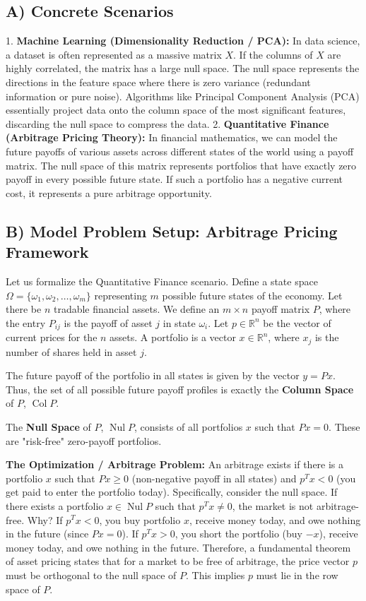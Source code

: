 \documentclass[11pt]{article}
\begin{document}
\subsection{A) Concrete Scenarios}
1. \textbf{Machine Learning (Dimensionality Reduction / PCA):} In data science, a dataset is often represented as a massive matrix $X$. If the columns of $X$ are highly correlated, the matrix has a large null space. The null space represents the directions in the feature space where there is zero variance (redundant information or pure noise). Algorithms like Principal Component Analysis (PCA) essentially project data onto the column space of the most significant features, discarding the null space to compress the data.
2. \textbf{Quantitative Finance (Arbitrage Pricing Theory):} In financial mathematics, we can model the future payoffs of various assets across different states of the world using a payoff matrix. The null space of this matrix represents portfolios that have exactly zero payoff in every possible future state. If such a portfolio has a negative current cost, it represents a pure arbitrage opportunity.

\subsection{B) Model Problem Setup: Arbitrage Pricing Framework}
Let us formalize the Quantitative Finance scenario. 
Define a state space $\Omega = \{\omega_1, \omega_2, \dots, \omega_m\}$ representing $m$ possible future states of the economy.
Let there be $n$ tradable financial assets. We define an $m \times n$ payoff matrix $P$, where the entry $P_{ij}$ is the payoff of asset $j$ in state $\omega_i$.
Let $p \in \mathbb{R}^n$ be the vector of current prices for the $n$ assets.
A portfolio is a vector $x \in \mathbb{R}^n$, where $x_j$ is the number of shares held in asset $j$.

The future payoff of the portfolio in all states is given by the vector $y = Px$. Thus, the set of all possible future payoff profiles is exactly the \textbf{Column Space} of $P$, $\operatorname{Col} P$.

The \textbf{Null Space} of $P$, $\operatorname{Nul} P$, consists of all portfolios $x$ such that $Px = 0$. These are "risk-free" zero-payoff portfolios. 

\textbf{The Optimization / Arbitrage Problem:}
An arbitrage exists if there is a portfolio $x$ such that $Px \ge 0$ (non-negative payoff in all states) and $p^T x < 0$ (you get paid to enter the portfolio today).
Specifically, consider the null space. If there exists a portfolio $x \in \operatorname{Nul} P$ such that $p^T x \neq 0$, the market is not arbitrage-free. 
Why? If $p^T x < 0$, you buy portfolio $x$, receive money today, and owe nothing in the future (since $Px = 0$). If $p^T x > 0$, you short the portfolio (buy $-x$), receive money today, and owe nothing in the future.
Therefore, a fundamental theorem of asset pricing states that for a market to be free of arbitrage, the price vector $p$ must be orthogonal to the null space of $P$. This implies $p$ must lie in the row space of $P$.
\end{document}
